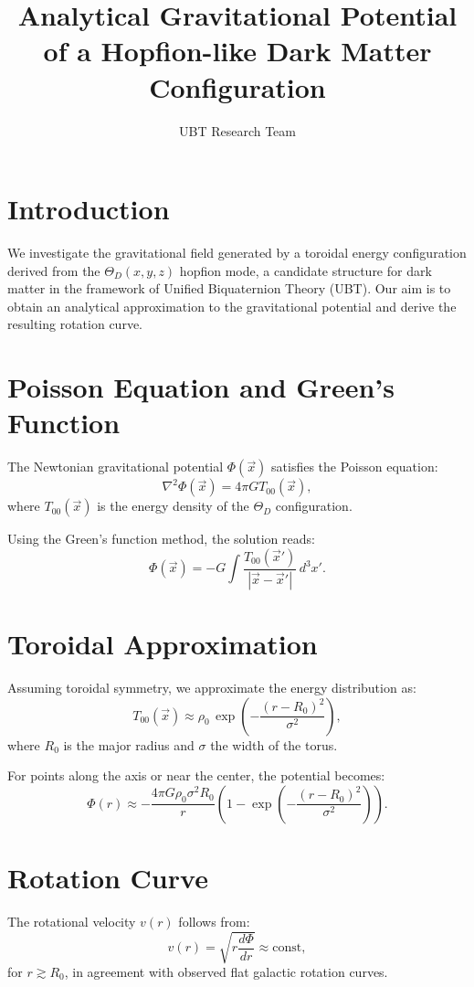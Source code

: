 \documentclass[12pt]{article}
\title{Analytical Gravitational Potential of a Hopfion-like Dark Matter Configuration}
\author{UBT Research Team}
\date{}
\begin{document}
\maketitle


\SpeculativeContentWarning

\section*{Introduction}

We investigate the gravitational field generated by a toroidal energy configuration derived from the $\Theta_D(x, y, z)$ hopfion mode, a candidate structure for dark matter in the framework of Unified Biquaternion Theory (UBT). Our aim is to obtain an analytical approximation to the gravitational potential and derive the resulting rotation curve.

\section*{Poisson Equation and Green's Function}

The Newtonian gravitational potential $\Phi(\vec{x})$ satisfies the Poisson equation:
\[
\nabla^2 \Phi(\vec{x}) = 4\pi G T_{00}(\vec{x}),
\]
where $T_{00}(\vec{x})$ is the energy density of the $\Theta_D$ configuration.

Using the Green's function method, the solution reads:
\[
\Phi(\vec{x}) = -G \int \frac{T_{00}(\vec{x}')}{|\vec{x} - \vec{x}'|} \, d^3x'.
\]

\section*{Toroidal Approximation}

Assuming toroidal symmetry, we approximate the energy distribution as:
\[
T_{00}(\vec{x}) \approx \rho_0 \, \exp\left(- \frac{(r - R_0)^2}{\sigma^2} \right),
\]
where $R_0$ is the major radius and $\sigma$ the width of the torus.

For points along the axis or near the center, the potential becomes:
\[
\Phi(r) \approx -\frac{4\pi G \rho_0 \sigma^2 R_0}{r} \left(1 - \exp\left(-\frac{(r - R_0)^2}{\sigma^2}\right)\right).
\]

\section*{Rotation Curve}

The rotational velocity $v(r)$ follows from:
\[
v(r) = \sqrt{r \frac{d\Phi}{dr}} \approx \text{const},
\]
for $r \gtrsim R_0$, in agreement with observed flat galactic rotation curves.
\end{document}
